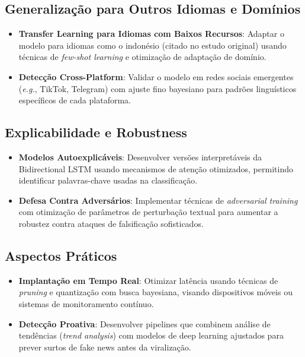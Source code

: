 \documentclass[conference]{IEEEtran}
\begin{document}
\subsection{Generalização para Outros Idiomas e Domínios}
\begin{itemize}
    \item \textbf{Transfer Learning para Idiomas com Baixos Recursos}: Adaptar o modelo para idiomas como o indonésio (citado no estudo original) usando técnicas de \textit{few-shot learning} e otimização de adaptação de domínio.
    
    \item \textbf{Detecção Cross-Platform}: Validar o modelo em redes sociais emergentes (\textit{e.g.}, TikTok, Telegram) com ajuste fino bayesiano para padrões linguísticos específicos de cada plataforma.
\end{itemize}

\subsection{Explicabilidade e Robustness}
\begin{itemize}
    \item \textbf{Modelos Autoexplicáveis}: Desenvolver versões interpretáveis da Bidirectional LSTM usando mecanismos de atenção otimizados, permitindo identificar palavras-chave usadas na classificação.
    
    \item \textbf{Defesa Contra Adversários}: Implementar técnicas de \textit{adversarial training} com otimização de parâmetros de perturbação textual para aumentar a robustez contra ataques de falsificação sofisticados.
\end{itemize}

\subsection{Aspectos Práticos}
\begin{itemize}
    \item \textbf{Implantação em Tempo Real}: Otimizar latência usando técnicas de \textit{pruning} e quantização com busca bayesiana, visando dispositivos móveis ou sistemas de monitoramento contínuo.
    
    \item \textbf{Detecção Proativa}: Desenvolver pipelines que combinem análise de tendências (\textit{trend analysis}) com modelos de deep learning ajustados para prever surtos de fake news antes da viralização.
\end{itemize}
\end{document}
